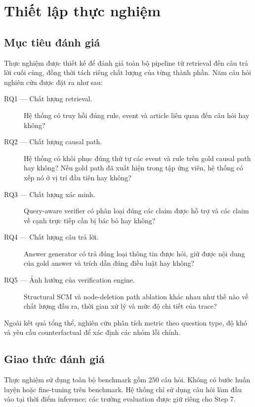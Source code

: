 \section{Thiết lập thực nghiệm}
\label{sec:experimental-setup}

\subsection{Mục tiêu đánh giá}

Thực nghiệm được thiết kế để đánh giá toàn bộ pipeline từ retrieval đến câu
trả lời cuối cùng, đồng thời tách riêng chất lượng của từng thành phần. Năm
câu hỏi nghiên cứu được đặt ra như sau:

\begin{description}
    \item[RQ1 --- Chất lượng retrieval.]
    Hệ thống có truy hồi đúng rule, event và article liên quan đến câu hỏi
    hay không?

    \item[RQ2 --- Chất lượng causal path.]
    Hệ thống có khôi phục đúng thứ tự các event và rule trên gold causal
    path hay không? Nếu gold path đã xuất hiện trong tập ứng viên, hệ thống
    có xếp nó ở vị trí đầu tiên hay không?

    \item[RQ3 --- Chất lượng xác minh.]
    Query-aware verifier có phân loại đúng các claim được hỗ trợ và các claim
    về cạnh trực tiếp cần bị bác bỏ hay không?

    \item[RQ4 --- Chất lượng câu trả lời.]
    Answer generator có trả đúng loại thông tin được hỏi, giữ được nội dung
    của gold answer và trích dẫn đúng điều luật hay không?

    \item[RQ5 --- Ảnh hưởng của verification engine.]
    Structural SCM và node-deletion path ablation khác nhau như thế nào về
    chất lượng đầu ra, thời gian xử lý và mức độ chi tiết của trace?
\end{description}

Ngoài kết quả tổng thể, nghiên cứu phân tích metric theo question type, độ
khó và yêu cầu counterfactual để xác định các nhóm lỗi chính.

\subsection{Giao thức đánh giá}

Thực nghiệm sử dụng toàn bộ benchmark gồm \(250\) câu hỏi. Không có bước
huấn luyện hoặc fine-tuning trên benchmark. Hệ thống chỉ sử dụng câu hỏi làm
đầu vào tại thời điểm inference; các trường evaluation được giữ riêng cho
Step 7.

